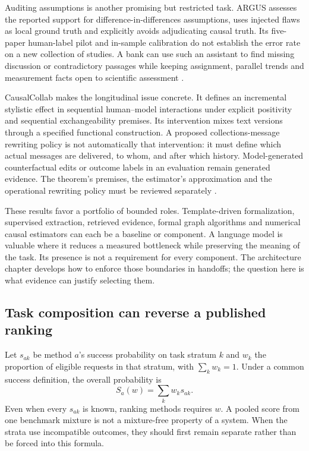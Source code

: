 Auditing assumptions is another promising but restricted task. ARGUS assesses
the reported support for difference-in-differences assumptions, uses injected
flaws as local ground truth and explicitly avoids adjudicating causal truth.
Its five-paper human-label pilot and in-sample calibration do not establish
the error rate on a new collection of studies. A bank can use such an assistant
to find missing discussion or contradictory passages while keeping assignment,
parallel trends and measurement facts open to scientific assessment
\cite{v12_la_2609_30867}.

CausalCollab makes the longitudinal issue concrete. It defines an incremental
stylistic effect in sequential human--model interactions under explicit
positivity and sequential exchangeability premises. Its intervention mixes
text versions through a specified functional construction. A proposed
collections-message rewriting policy is not automatically that intervention:
it must define which actual messages are delivered, to whom, and after which
history. Model-generated counterfactual edits or outcome labels in an
evaluation remain generated evidence. The theorem's premises, the estimator's
approximation and the operational rewriting policy must be reviewed separately
\cite{exec13_census_collaboration}.

These results favor a portfolio of bounded roles. Template-driven formalization,
supervised extraction, retrieved evidence, formal graph algorithms and numerical
causal estimators can each be a baseline or component. A language model is
valuable where it reduces a measured bottleneck while preserving the meaning
of the task. Its presence is not a requirement for every component. The
architecture chapter develops how to enforce those boundaries in handoffs;
the question here is what evidence can justify selecting them.

\subsection{Task composition can reverse a published ranking}

Let $s_{ak}$ be method $a$'s success probability on task stratum $k$ and $w_k$
the proportion of eligible requests in that stratum, with $\sum_k w_k=1$.
Under a common success definition, the overall probability is
\begin{equation}
 S_a(w)=\sum_k w_k s_{ak}.
 \label{exec13:frontier-mixture}
\end{equation}
Even when every $s_{ak}$ is known, ranking methods requires $w$. A pooled score
from one benchmark mixture is not a mixture-free property of a system. When
the strata use incompatible outcomes, they should first remain separate rather
than be forced into this formula.

